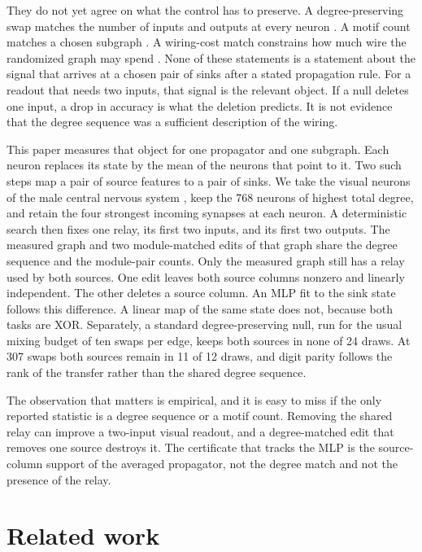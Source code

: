 \documentclass[10pt,twocolumn,letterpaper]{article}
\begin{document}
They do not yet agree on what the control has to preserve.
A degree-preserving swap matches the number of inputs and outputs at every neuron \cite{maslov2002}.
A motif count matches a chosen subgraph \cite{milo2002}.
A wiring-cost match constrains how much wire the randomized graph may spend \cite{correig2026}.
None of these statements is a statement about the signal that arrives at a chosen pair of sinks after a stated propagation rule.
For a readout that needs two inputs, that signal is the relevant object.
If a null deletes one input, a drop in accuracy is what the deletion predicts.
It is not evidence that the degree sequence was a sufficient description of the wiring.

This paper measures that object for one propagator and one subgraph.
Each neuron replaces its state by the mean of the neurons that point to it.
Two such steps map a pair of source features to a pair of sinks.
We take the visual neurons of the male central nervous system \cite{berg2026}, keep the 768 neurons of highest total degree, and retain the four strongest incoming synapses at each neuron.
A deterministic search then fixes one relay, its first two inputs, and its first two outputs.
The measured graph and two module-matched edits of that graph share the degree sequence and the module-pair counts.
Only the measured graph still has a relay used by both sources.
One edit leaves both source columns nonzero and linearly independent.
The other deletes a source column.
An MLP fit to the sink state follows this difference.
A linear map of the same state does not, because both tasks are XOR.
Separately, a standard degree-preserving null, run for the usual mixing budget of ten swaps per edge, keeps both sources in none of 24 draws. At 307 swaps both sources remain in 11 of 12 draws, and digit parity follows the rank of the transfer rather than the shared degree sequence.

The observation that matters is empirical, and it is easy to miss if the only reported statistic is a degree sequence or a motif count.
Removing the shared relay can improve a two-input visual readout, and a degree-matched edit that removes one source destroys it.
The certificate that tracks the MLP is the source-column support of the averaged propagator, not the degree match and not the presence of the relay.

\section{Related work}
\label{sec:related}
\end{document}
